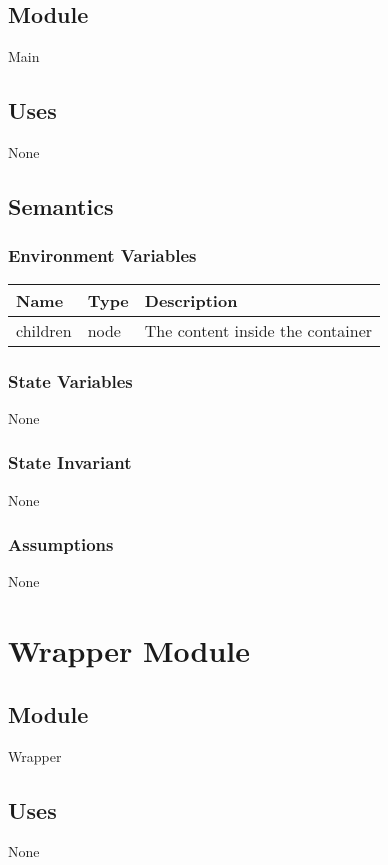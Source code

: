 \documentclass[12pt]{article}
\begin{document}
\subsection{Module}
Main

\subsection{Uses}
None

\subsection{Semantics}

\subsubsection{Environment Variables}
\begin{tabular}{| l | l | p{10cm} |}
    \hline
    \textbf{Name} & \textbf{Type} & \textbf{Description}\\ \hline
    children & node & The content inside the container\\ \hline
\end{tabular}

\subsubsection{State Variables}
None

\subsubsection{State Invariant}
None

\subsubsection{Assumptions}
None

\newpage

\section{Wrapper Module}

\subsection{Module}
Wrapper

\subsection{Uses}
None
\end{document}
